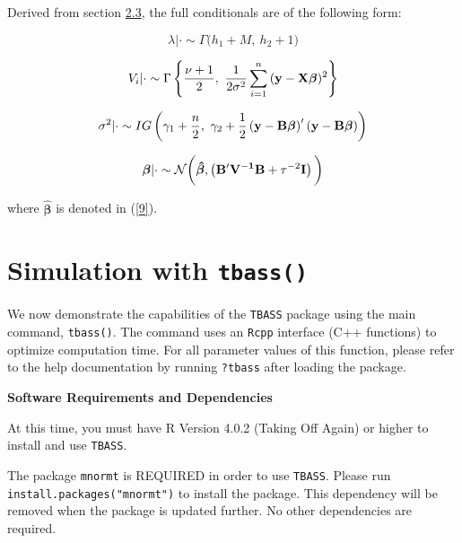 \documentclass[
]{article}
\begin{document}
Derived from section \protect\hyperlink{priors}{2.3}, the full
conditionals are of the following form:

\begin{equation}
\lambda | \cdot\sim \Gamma\big(h_1 + M, ~h_2 + 1\big)
\end{equation}

\begin{equation}
V_i | \cdot \sim \Gamma\left\lbrace\frac{\nu + 1}{2},~ \frac{1}{2\sigma^2} \sum_{i=1}^{n}{({\bf y} - {\bf X}\boldsymbol\beta)^2}\right\rbrace
\end{equation}

\begin{equation}
\sigma^2 | \cdot\sim IG\left(\gamma_1 + \frac{n}{2}, ~\gamma_2 + \frac{1}{2} \left({\bf y} - {\bf B}\boldsymbol{\beta}\right)' \left({\bf y} - {\bf B}\boldsymbol{\beta}\right)  \right)
\end{equation}

\begin{equation}
\boldsymbol{\beta} | \cdot \sim \mathcal{N}\bigg( \boldsymbol{\hat\beta}, \left({\bf B'V^{-1}B} + \tau^{-2}{\bf I}\right) \bigg)
\end{equation}

where \(\boldsymbol{\hat\beta}\) is denoted in (\ref{9}).\newline

\pagebreak

\hypertarget{tbass}{%
\section{\texorpdfstring{Simulation with
\texttt{tbass()}}{Simulation with tbass()}}\label{tbass}}

We now demonstrate the capabilities of the \texttt{TBASS} package using
the main command, \texttt{tbass()}. The command uses an \texttt{Rcpp}
interface (C++ functions) to optimize computation time. For all
parameter values of this function, please refer to the help
documentation by running \texttt{?tbass} after loading the
package.\newline

\textbf{Software Requirements and Dependencies}

At this time, you must have R Version 4.0.2 (Taking Off Again) or higher
to install and use \texttt{TBASS}.

The package \texttt{mnormt} is REQUIRED in order to use \texttt{TBASS}.
Please run \texttt{install.packages("mnormt")} to install the package.
This dependency will be removed when the package is updated further. No
other dependencies are required.\newline
\end{document}
